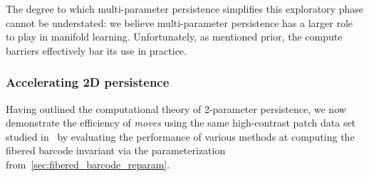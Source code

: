 \documentclass[sn-mathphys]{sn-jnl}
\begin{document}
The degree to which multi-parameter persistence simplifies this exploratory phase cannot be understated: we believe multi-parameter persistence has a larger role to play in manifold learning. 
Unfortunately, as mentioned prior, the compute barriers effectively bar its use in practice. 

\subsubsection{Accelerating 2D persistence}\label{sec:empirical_klein}
Having outlined the computational theory of 2-parameter persistence, we now demonstrate the efficiency of \emph{moves} using the same high-contrast patch data set studied in~\cite{lee2003nonlinear} by evaluating the performance of various methods at computing the fibered barcode invariant via the parameterization from~\ref{sec:fibered_barcode_reparam}. 
\end{document}
